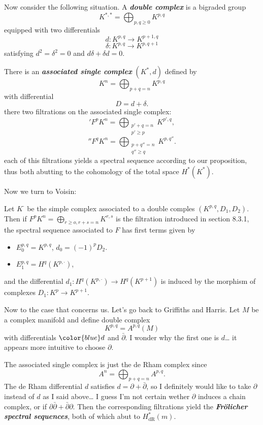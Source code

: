 {\color{cyan}Now consider the following situation.} A \textit{\textbf{double complex}} is a bigraded group
\[K^{*,*}=\bigoplus_{p,q\geq 0}  K^{p,q}\]
equipped with two differentials
\[d:K^{p,q}\to K^{p+1,q}\]
\[\delta:K^{p,q}\to K^{p,q+1}\]
satisfying $d^2=\delta^2=0$ and $d\delta +\delta d=0$.

There is an \textit{\textbf{associated single complex}} $(K^*,d)$ defined by
\[K^n=\bigoplus_{p+q=n} K^{p,q} \]
with differential
\[D=d+\delta.\]
there two filtrations on the associated single complex:
\['F^pK^n=\bigoplus_{\substack{p'+q=n\\p'\geq p}}K^{p',q},\]
	\[''F^qK^n=\bigoplus_{\substack{p+q''=n\\q''\geq q}}K^{p,q''}.\]
each of this filtrations yields a spectral sequence according to our proposition, thus both abutting to the cohomology of the total space $H^{*}(K^*)$.

Now we turn to Voisin:

\begin{prop}[Voisin, 8.25]
	Let $K^\cdot$ be the simple complex associated to a double comples $(K^{p,q},D_1,D_2)$. Then if $F^pK^n=\bigoplus_{r\geq o,r+s=n} K^{r,s}$ is the filtration introduced in section 8.3.1, the spectral sequence associated to $F$ has first terms given by
	\begin{itemize}
		\item $E^{p,q}_0=K^{p,q}$, $d_0=(-1)^pD_2$.
		\item $E^{p,q}_1=H^{q}(K^{p,\cdot})$,
	\end{itemize}
	and the differential $d_1:H^{q}(K^{p,\cdot })\to H^{q}(K^{p+1})$ is induced by the morphism of complexes $D_1:K^p\to K^{p+1}$. 

\end{prop}

{\color{cyan}Now to the case that concerns us. Let's go back to Griffiths and Harris.} Let $M$ be a complex manifold and define double complex
\[K^{p,q}=A^{p,q}(M)\]
with differentials ${\color{blue}d}$ and $\bar\partial$. {\color{blue}I wonder why the first one is $ d$… it appears more intuitive to choose $\partial$.}

The associated single complex is just the de Rham complex since
\[A^{n}=\bigoplus_{p+q=n} A^{p,q}.\]
{\color{blue}The de Rham differential $d$ satisfies $d=\partial+\bar\partial$, so I definitely would like to take $\partial$ instead of $d$ as I said above… I guess I'm not certain wether $\partial$ induces a chain complex, or if $\partial\bar\partial+\bar\partial\partial$}. Then the corresponding filtrations yield the \textit{\textbf{Fr\"olicher spectral sequences}}, both of which abut to $H^{*}_{\operatorname{dR}}(m)$.

